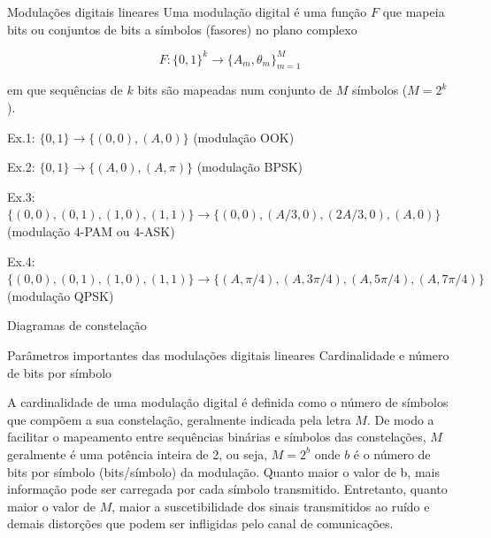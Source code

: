 \documentclass[
  ignorenonframetext,
]{beamer}
\begin{document}
\begin{frame}{Modulações digitais lineares}
\label{modulauxe7uxf5es-digitais-lineares}
Uma modulação digital é uma função \(F\) que mapeia bits ou conjuntos de
bits a símbolos (fasores) no plano complexo

\[ F: \{0, 1\}^k\rightarrow \{A_m,\theta_m\}_{m=1}^M\]

em que sequências de \(k\) bits são mapeadas num conjunto de \(M\)
símbolos (\(M=2^k\)).

Ex.1: \(\{0, 1\}\rightarrow \{(0, 0), (A, 0)\}\) (modulação OOK)

Ex.2: \(\{0, 1\}\rightarrow \{(A, 0), (A, \pi )\}\) (modulação BPSK)

Ex.3:
\(\{(0, 0),(0, 1),(1, 0),(1, 1)\}\rightarrow \{(0, 0), (A/3, 0), (2A/3, 0), (A, 0)\}\)
(modulação 4-PAM ou 4-ASK)

Ex.4:
\(\{(0, 0),(0, 1),(1, 0),(1, 1)\}\rightarrow \{(A, \pi/4), (A, 3\pi/4), (A, 5\pi/4), (A, 7\pi/4)\}\)
(modulação QPSK)
\end{frame}

\begin{frame}{Diagramas de constelação}
\label{diagramas-de-constelauxe7uxe3o}
\end{frame}

\begin{frame}{Parâmetros importantes das modulações digitais lineares}
\label{paruxe2metros-importantes-das-modulauxe7uxf5es-digitais-lineares}
Cardinalidade e número de bits por símbolo

A cardinalidade de uma modulação digital é definida como o número de
símbolos que compõem a sua constelação, geralmente indicada pela letra
\(M\). De modo a facilitar o mapeamento entre sequências binárias e
símbolos das constelações, \(M\) geralmente é uma potência inteira de 2,
ou seja, \(M=2^b\) onde \(b\) é o número de bits por símbolo
(bits/símbolo) da modulação. Quanto maior o valor de b, mais informação
pode ser carregada por cada símbolo transmitido. Entretanto, quanto
maior o valor de \(M\), maior a suscetibilidade dos sinais transmitidos
ao ruído e demais distorções que podem ser infligidas pelo canal de
comunicações.
\end{frame}
\end{document}
